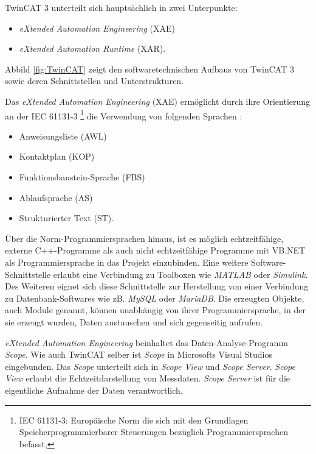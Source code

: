 TwinCAT 3 unterteilt sich hauptsächlich in zwei Unterpunkte: 

\begin{itemize}
\item	\textit{eXtended Automation Engineering} (XAE)
\item	\textit{eXtended Automation Runtime} (XAR).
\end{itemize}

Abbild \ref{fig:TwinCAT} zeigt den softwaretechnischen Aufbaus von TwinCAT 3 sowie deren Schnittstellen und Unterstrukturen.

Das \textit{eXtended Automation Engineering} (XAE) ermöglicht durch ihre Orientierung an der IEC 61131-3 \footnote{IEC 61131-3:  Europäische Norm die sich mit den Grundlagen Speicherprogrammierbarer Steuerungen bezüglich Programmiersprachen befasst,} die Verwendung von folgenden Sprachen :

\begin{itemize}
\item	Anweisungsliste (AWL)
\item	Kontaktplan (KOP)
\item 	Funktionsbaustein-Sprache (FBS)
\item	Ablaufsprache (AS)
\item	Strukturierter Text (ST).
\end{itemize}

Über die Norm-Programmiersprachen hinaus, ist es möglich echtzeitfähige, externe C++-Programme als auch nicht echtzeitfähige Programme mit VB.NET  als Programmiersprache in das Projekt einzubinden. Eine weitere Software-Schnittstelle erlaubt eine Verbindung zu  Toolboxen wie \textit{MATLAB} oder \textit{Simulink}. Des Weiteren eignet sich diese Schnittstelle zur Herstellung von einer Verbindung zu Datenbank-Softwares wie zB.\textit{ MySQL} oder \textit{MariaDB}. Die erzeugten Objekte, auch Module genannt, können unabhängig von ihrer Programmiersprache, in der sie erzeugt wurden,  Daten austauschen und sich gegenseitig aufrufen. 

\textit{eXtended Automation Engineering} beinhaltet das Daten-Analyse-Programm \textit{Scope}. Wie auch TwinCAT selber ist \textit{Scope} in Microsofts Visual Studios eingebunden. Das \textit{Scope} unterteilt sich in \textit{Scope View} und \textit{Scope Server}. \textit{Scope View} erlaubt die Echtzeitdarstellung von Messdaten.  \textit{Scope Server} ist für die eigentliche Aufnahme der Daten verantwortlich.


